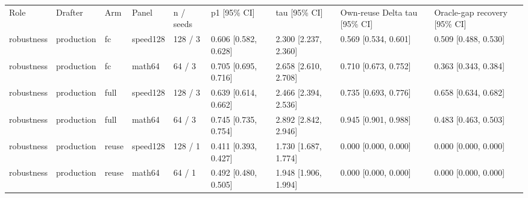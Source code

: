 \begin{tabular}{lllllllll}
Role & Drafter & Arm & Panel & n / seeds & p1 [95\% CI] & tau [95\% CI] & Own-reuse Delta tau [95\% CI] & Oracle-gap recovery [95\% CI] \\
robustness & production & fc & speed128 & 128 / 3 & 0.606 [0.582, 0.628] & 2.300 [2.237, 2.360] & 0.569 [0.534, 0.601] & 0.509 [0.488, 0.530] \\
robustness & production & fc & math64 & 64 / 3 & 0.705 [0.695, 0.716] & 2.658 [2.610, 2.708] & 0.710 [0.673, 0.752] & 0.363 [0.343, 0.384] \\
robustness & production & full & speed128 & 128 / 3 & 0.639 [0.614, 0.662] & 2.466 [2.394, 2.536] & 0.735 [0.693, 0.776] & 0.658 [0.634, 0.682] \\
robustness & production & full & math64 & 64 / 3 & 0.745 [0.735, 0.754] & 2.892 [2.842, 2.946] & 0.945 [0.901, 0.988] & 0.483 [0.463, 0.503] \\
robustness & production & reuse & speed128 & 128 / 1 & 0.411 [0.393, 0.427] & 1.730 [1.687, 1.774] & 0.000 [0.000, 0.000] & 0.000 [0.000, 0.000] \\
robustness & production & reuse & math64 & 64 / 1 & 0.492 [0.480, 0.505] & 1.948 [1.906, 1.994] & 0.000 [0.000, 0.000] & 0.000 [0.000, 0.000] \\
\end{tabular}
